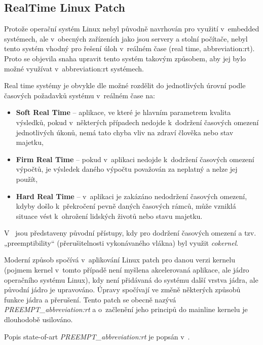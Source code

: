 \documentclass[a4paper, twoside, 11pt]{article}
\begin{document}
		\subsection{RealTime Linux Patch}\label{subsec:real-time-linux-patch}
			Protože operační systém Linux nebyl původně navrhován pro využití v~embedded systémech, ale v~obecných zařízeních jako jsou servery a stolní počítače, nebyl tento systém vhodný pro řešení úloh v~reálném čase (real time, \gls{abbreviation:rt}). Proto se objevila snaha upravit tento systém takovým způsobem, aby jej bylo možné využívat v~\gls{abbreviation:rt} systémech.\par
			Real time systémy je obvykle dle \cite{the-real-time-linux-kernel-survey-on-preempt-rt} možné rozdělit do jednotlivých úrovní podle časových požadavků systému v~reálném čase na:
			\begin{itemize}
				\item \textbf{Soft Real Time} – aplikace, ve které je hlavním parametrem kvalita výsledků, pokud v~některých případech nedojde k~dodržení časových omezení jednotlivých úkonů, nemá tato chyba vliv na zdraví člověka nebo stav majetku,
				\item \textbf{Firm Real Time} – pokud v~aplikaci nedojde k~dodržení časových omezení výpočtů, je výsledek daného výpočtu považován za neplatný a nelze jej použít,
				\item \textbf{Hard Real Time} – v~aplikaci je zakázáno nedodržení časových omezení, kdyby došlo k~překročení pevně daných časových rámců, může vzniklá situace vést k~ohrožení lidských životů nebo stavu majetku.
			\end{itemize}\par
			V~\cite{the-real-time-linux-kernel-survey-on-preempt-rt} jsou představeny původní přístupy, kdy pro dodržení časových omezení a tzv. „preemptibility“ (přerušitelnosti vykonávaného vlákna) byl využit \textit{cokernel}.\par
			Moderní způsob spočívá v~aplikování Linux patch pro danou verzi kernelu (pojmem kernel v~tomto případě není myšlena akcelerovaná aplikace, ale jádro operačního systému Linux), kdy není přidávaná do systému další vrstva jádra, ale původní jádro je upravováno. Úpravy spočívají ve změně některých způsobů funkce jádra a přerušení. Tento patch se obecně nazývá \textit{PREEMPT\_\gls{abbreviation:rt}} a o~začlenění jeho principů do mainline kernelu je dlouhodobě usilováno. \cite{the-real-time-linux-kernel-survey-on-preempt-rt}\par
			Popis state-of-art \textit{PREEMPT\_\gls{abbreviation:rt}} je popsán v~\cite{the-real-time-linux-kernel-survey-on-preempt-rt}.\par
\end{document}
